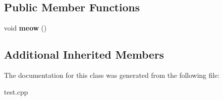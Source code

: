 \subsection*{Public Member Functions}
\begin{DoxyCompactItemize}
\item 
\hypertarget{class_cat_aa770c672b7458b036d7384a6915d9367}{void {\bfseries meow} ()}\label{class_cat_aa770c672b7458b036d7384a6915d9367}

\end{DoxyCompactItemize}
\subsection*{Additional Inherited Members}


The documentation for this class was generated from the following file\-:\begin{DoxyCompactItemize}
\item 
test.\-cpp\end{DoxyCompactItemize}
